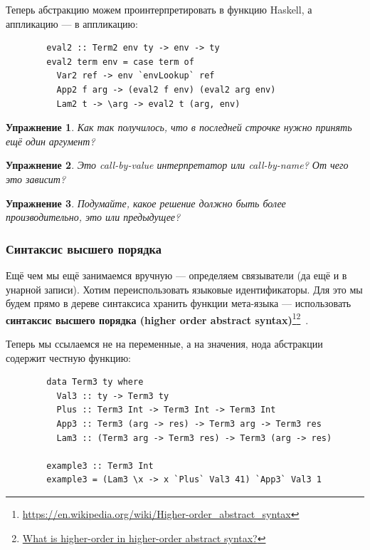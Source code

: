 \documentclass[12pt]{article}
\newcommand{\vocab}[1]{\textbf{#1}} %
\newtheorem{task}{Упражнение}
\begin{document}
    Теперь абстракцию можем проинтерпретировать в функцию Haskell, а аппликацию --- в аппликацию:
    \begin{verbatim}
        eval2 :: Term2 env ty -> env -> ty
        eval2 term env = case term of
          Var2 ref -> env `envLookup` ref
          App2 f arg -> (eval2 f env) (eval2 arg env)
          Lam2 t -> \arg -> eval2 t (arg, env)
    \end{verbatim}

    \begin{task}
        Как так получилось, что в последней строчке нужно принять ещё один аргумент?
    \end{task}

    \begin{task}
        Это call-by-value интерпретатор или call-by-name?
        От чего это зависит?
    \end{task}

    \begin{task}
        Подумайте, какое решение должно быть более производительно, это или предыдущее?
    \end{task}

    \subsubsection{Синтаксис высшего порядка}

    Ещё чем мы ещё занимаемся вручную --- определяем связыватели (да ещё и в унарной записи).
    Хотим переиспользовать языковые идентификаторы.
    Для это мы будем прямо в дереве синтаксиса хранить функции мета-языка --- использовать \vocab{синтаксис высшего порядка (higher order abstract syntax)}\footnote{\url{https://en.wikipedia.org/wiki/Higher-order_abstract_syntax}}\footnote{\href{https://cstheory.stackexchange.com/questions/20071/what-is-higher-order-in-higher-order-abstract-syntax}{What is higher-order in higher-order abstract syntax?}}~\cite{pfenning1988higher}.

    Теперь мы ссылаемся не на переменные, а на значения, нода абстракции содержит честную функцию:
    \begin{verbatim}
        data Term3 ty where
          Val3 :: ty -> Term3 ty
          Plus :: Term3 Int -> Term3 Int -> Term3 Int
          App3 :: Term3 (arg -> res) -> Term3 arg -> Term3 res
          Lam3 :: (Term3 arg -> Term3 res) -> Term3 (arg -> res)

        example3 :: Term3 Int
        example3 = (Lam3 \x -> x `Plus` Val3 41) `App3` Val3 1
    \end{verbatim}
\end{document}

